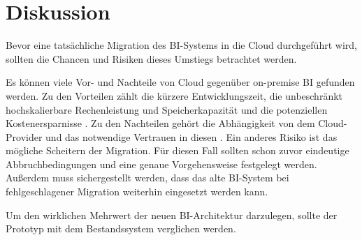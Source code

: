 \chapter{Diskussion}
\label{ch:diskussion}
Bevor eine tatsächliche Migration des BI-Systems in die Cloud durchgeführt wird, sollten die Chancen und Risiken dieses Umstiegs betrachtet werden.

Es können viele Vor- und Nachteile von Cloud gegenüber on-premise BI gefunden werden. Zu den Vorteilen zählt die kürzere Entwicklungszeit, die unbeschränkt hochskalierbare Rechenleistung und Speicherkapazität und die potenziellen Kostenersparnisse \cite{ouf_cloud_2011}. Zu den Nachteilen gehört die Abhängigkeit von dem Cloud-Provider und das notwendige Vertrauen in diesen \cite{menon_business_2012}. Ein anderes Risiko ist das mögliche Scheitern der Migration. Für diesen Fall sollten schon zuvor eindeutige Abbruchbedingungen und eine genaue Vorgehensweise festgelegt werden. Außerdem muss sichergestellt werden, dass das alte BI-System bei fehlgeschlagener Migration weiterhin eingesetzt werden kann.

Um den wirklichen Mehrwert der neuen BI-Architektur darzulegen, sollte der Prototyp mit dem Bestandssystem verglichen werden.
